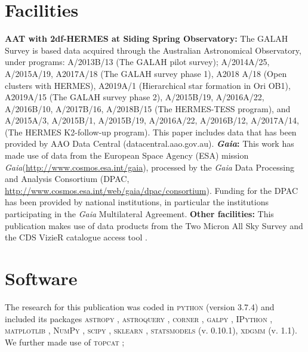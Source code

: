 \documentclass[
  journal=pasa,
  manuscript=research-paper, %
  year=2021,
  volume=37,
]{cup-journal}
\newcommand{\Gaia}{\textit{Gaia}\xspace}
\begin{document}
\section*{Facilities}

\textbf{AAT with 2df-HERMES at Siding Spring Observatory:}
The GALAH Survey is based data acquired through the Australian Astronomical Observatory, under programs: A/2013B/13 (The GALAH pilot survey); A/2014A/25, A/2015A/19, A2017A/18 (The GALAH survey phase 1), A2018 A/18 (Open clusters with HERMES), A2019A/1 (Hierarchical star formation in Ori OB1), A2019A/15 (The GALAH survey phase 2), A/2015B/19, A/2016A/22, A/2016B/10, A/2017B/16, A/2018B/15 (The HERMES-TESS program), and A/2015A/3, A/2015B/1, A/2015B/19, A/2016A/22, A/2016B/12, A/2017A/14, (The HERMES K2-follow-up program). This paper includes data that has been provided by AAO Data Central (datacentral.aao.gov.au).
\textbf{\Gaia: } This work has made use of data from the European Space Agency (ESA) mission \Gaia (\url{http://www.cosmos.esa.int/gaia}), processed by the \Gaia Data Processing and Analysis Consortium (DPAC, \url{http://www.cosmos.esa.int/web/gaia/dpac/consortium}). Funding for the DPAC has been provided by national institutions, in particular the institutions participating in the \Gaia Multilateral Agreement. 
\textbf{Other facilities:} This publication makes use of data products from the Two Micron All Sky Survey \citep{Skrutskie2006} and the CDS VizieR catalogue access tool \citep{Vizier2000}.

\section*{Software}

The research for this publication was coded in \textsc{python} (version 3.7.4) and included its packages
\textsc{astropy} \citep[v. 3.2.2;][]{Robitaille2013,PriceWhelan2018},
\textsc{astroquery} \citep[v. 0.4;][]{Ginsburg2019},
\textsc{corner} \citep[v. 2.0.1;][]{corner},
\textsc{galpy} \citep[version 1.6.0;][]{Bovy2015},
\textsc{IPython} \citep[v. 7.8.0;][]{ipython},
\textsc{matplotlib} \citep[v. 3.1.3;][]{matplotlib},
\textsc{NumPy} \citep[v. 1.17.2;][]{numpy},
\textsc{scipy} \citep[version 1.3.1;][]{scipy},
\textsc{sklearn} \citep[v. 0.21.3;][]{scikit-learn},
\textsc{statsmodels} (v. 0.10.1),
\textsc{xdgmm} (v. 1.1).
We further made use of \textsc{topcat} \citep[version 4.7;][]{Taylor2005};
\end{document}
